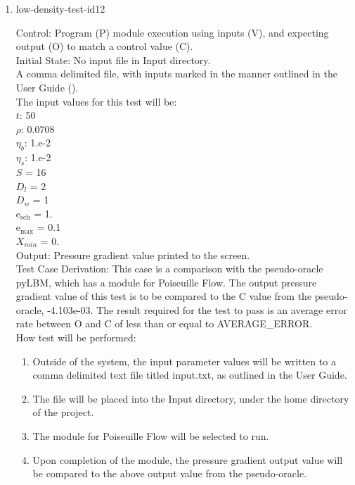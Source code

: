 \documentclass[12pt, titlepage]{article}
\begin{document}
\begin{enumerate}
\item{low-density-test-id12\\}

Control: Program (P) module execution using inputs (V), and expecting output (O) to match a control value (C).\\
					
Initial State: No input file in Input directory.\\
					
A comma delimited file, with inputs marked in the manner outlined in the User Guide (\citet{LBM_UserGuide_PM}).\\The input values for this test will be:\\
$t$: 50\\
$\rho$: 0.0708\\
$\eta_b$: 1.e-2\\
$\eta_s$: 1.e-2\\
$S$ = 16\\
$D_{l}$ = 2\\
$D_{w}$ = 1\\
$\mathrm{e_{sch}}$ = 1.\\
$\mathrm{e_{max}}$ = 0.1\\
$X_{min}$ = 0.\\

					
Output: Pressure gradient value printed to the screen. \\ 

Test Case Derivation: This case is a comparison with the pseudo-oracle pyLBM, which has a module for Poiseuille Flow. The output pressure gradient value of this test is to be compared to the C value from the pseudo-oracle, -4.103e-03. The result required for the test to pass is an average error rate between O and C of less than or equal to AVERAGE\_ERROR.\\

					
How test will be performed: 

\begin{enumerate}
\item Outside of the system, the input parameter values will be written to a comma delimited text file titled input.txt, as outlined in the User Guide.
\item The file will be placed into the Input directory, under the home directory of the project.
\item The module for Poiseuille Flow will be selected to run.
\item Upon completion of the module, the pressure gradient output value will be compared to the above output value from the pseudo-oracle.
\end{enumerate}	


\end{enumerate}
\end{document}
